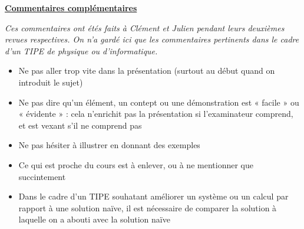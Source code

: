 \documentclass{article}
\begin{document}
\newpage{}

\underline{\textbf{Commentaires complémentaires}}

\textit{Ces commentaires ont étés faits à Clément et Julien pendant leurs deuxièmes revues respectives. On n'a gardé ici que les commentaires pertinents dans le cadre d'un TIPE de physique ou d'informatique.}

\begin{itemize}
    \item Ne pas aller trop vite dans la présentation (surtout au début quand on introduit le sujet)
    \item Ne pas dire qu'un élément, un contept ou une démonstration est « facile » ou « évidente » : cela n'enrichit pas la présentation si l'examinateur comprend, et est vexant s'il ne comprend pas
    \item Ne pas hésiter à illustrer en donnant des exemples
    \item Ce qui est proche du cours est à enlever, ou à ne mentionner que succintement
    \item Dans le cadre d'un TIPE souhatant améliorer un système ou un calcul par rapport à une solution naïve, il est nécessaire de comparer la solution à laquelle on a abouti avec la solution naïve
\end{itemize}
\end{document}
